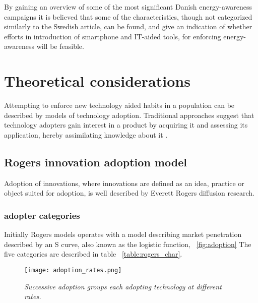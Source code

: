 \documentclass[journal]{IEEEtran}
\begin{document}
By gaining an overview of some of the most significant Danish energy-awareness campaigns it is believed that some of the characteristics, though not categorized similarly to the Swedish article, can be found, and give an indication of whether efforts in introduction of smartphone and IT-aided tools, for enforcing energy-awareness will be feasible.

\section{Theoretical considerations}
Attempting to enforce new technology aided habits in a population can be described by models of technology adoption. 
Traditional approaches suggest that technology adopters gain interest in a product by acquiring it and assessing its application, hereby assimilating knowledge about it \cite{gilbert}.

\subsection{Rogers innovation adoption model}
Adoption of innovations, where innovations are defined as an idea, practice or object suited for adoption, is well described by Everett Rogers diffusion research.

\subsubsection{adopter categories}
Initially Rogers models \cite{rogers_model} operates with a model describing market penetration described by an S curve, also known as the logistic function, ~\ref{fig:adoption}
The five categories are described in table ~\ref{table:rogers_char}. \newline

\begin{figure}
\texttt{[image: adoption\_rates.png]}
\caption{\textit{Successive adoption groups each adopting technology at different rates.}}			
\end{figure}
\label{fig:adoption} %
\end{document}
